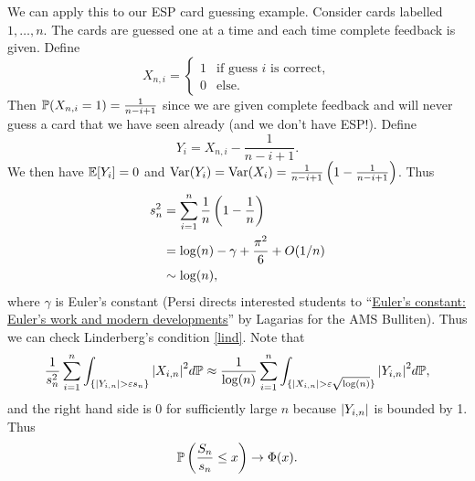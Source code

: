 \begin{ex}
    We can apply this to our ESP card guessing example. Consider cards labelled $1,\ldots, n$. The cards are guessed one at a time and each time complete feedback is given. Define 
    \[X_{n,i} = \begin{cases}
        1 & \text{if guess $i$ is correct},\\
        0 & \text{else}.
    \end{cases} \] 
    Then ${\mathbb{P}}(X_{n,i}=1) = \frac{1}{n-i+1}$ since we are given complete feedback and will never guess a card that we have seen already (and we don't have ESP!). Define 
    \[Y_i = X_{n,i} - \frac{1}{n-i+1}. \]
    We then have ${\mathbb{E}}[Y_i]=0$ and $\operatorname{Var}(Y_i) = \operatorname{Var}(X_i) = \frac{1}{n-i+1}\left(1-\frac{1}{n-i+1}\right)$. Thus
    \begin{align*}
        s_n^2 &= \sum_{i=1}^n \frac{1}{n}\left(1-\frac{1}{n}\right)\\
        &= \log(n)-\gamma+\frac{\pi^2}{6}+O(1/n)\\
        &\sim \log(n),
    \end{align*}
    where $\gamma$ is Euler's constant (Persi directs interested students to ``\href{https://www.ams.org/journals/bull/2013-50-04/S0273-0979-2013-01423-X/S0273-0979-2013-01423-X.pdf}{Euler's constant: Euler's work and modern developments}'' by Lagarias for the AMS Bulliten). Thus we can check Linderberg's condition \eqref{lind}. Note that
    \[\frac{1}{s_n^2}\sum_{i=1}^{n}\int_{\{{\left\lvert Y_{i,n}\right\rvert} > \varepsilon s_n\}}{\left\lvert X_{i,n}\right\rvert}^2d{\mathbb{P}}\approx \frac{1}{\log(n)}\sum_{i=1}^{n}\int_{\{{\left\lvert X_{i,n}\right\rvert} > \varepsilon\sqrt{\log(n)}\}}{\left\lvert Y_{i,n}\right\rvert}^2d{\mathbb{P}}, \]
    and the right hand side is 0 for sufficiently large $n$ because ${\left\lvert Y_{i,n}\right\rvert}$ is bounded by 1. Thus
    \[{\mathbb{P}}\left(\frac{S_n}{s_n}\le x\right)\to \Phi(x). \]
\end{ex}

